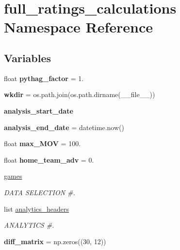 \hypertarget{namespacefull__ratings__calculations}{}\section{full\+\_\+ratings\+\_\+calculations Namespace Reference}
\label{namespacefull__ratings__calculations}
\subsection*{Variables}
\begin{DoxyCompactItemize}
\item 
float {\bfseries pythag\+\_\+factor} = 1.\hypertarget{namespacefull__ratings__calculations_a39ba6d50f8e6e562fb1a2fa2ca375f58}{}\label{namespacefull__ratings__calculations_a39ba6d50f8e6e562fb1a2fa2ca375f58}

\item 
{\bfseries wkdir} = os.\+path.\+join(os.\+path.\+dirname(\+\_\+\+\_\+file\+\_\+\+\_\+))\hypertarget{namespacefull__ratings__calculations_ac96f2c2bb04da9812f110cc76dd60531}{}\label{namespacefull__ratings__calculations_ac96f2c2bb04da9812f110cc76dd60531}

\item 
{\bfseries analysis\+\_\+start\+\_\+date}
\item 
{\bfseries analysis\+\_\+end\+\_\+date} = datetime.\+now()\hypertarget{namespacefull__ratings__calculations_a6a513ee89411a8bf6ef8e7c8340ac6e6}{}\label{namespacefull__ratings__calculations_a6a513ee89411a8bf6ef8e7c8340ac6e6}

\item 
float {\bfseries max\+\_\+\+M\+OV} = 100.\hypertarget{namespacefull__ratings__calculations_ac371015f1925cbaeb2a9b2fd3ceb2601}{}\label{namespacefull__ratings__calculations_ac371015f1925cbaeb2a9b2fd3ceb2601}

\item 
float {\bfseries home\+\_\+team\+\_\+adv} = 0.\hypertarget{namespacefull__ratings__calculations_a640672e2eaa8f30e85a5127ad2db7432}{}\label{namespacefull__ratings__calculations_a640672e2eaa8f30e85a5127ad2db7432}

\item 
\hyperlink{namespacefull__ratings__calculations_ad7fbe206580dbeabe107c6ac5b3fe020}{games}
\begin{DoxyCompactList}\small\item\em D\+A\+TA S\+E\+L\+E\+C\+T\+I\+ON \#. \end{DoxyCompactList}\item 
list \hyperlink{namespacefull__ratings__calculations_aa4a596206d6d9542a6b4bc0a737dfd6a}{analytics\+\_\+headers}
\begin{DoxyCompactList}\small\item\em A\+N\+A\+L\+Y\+T\+I\+CS \#. \end{DoxyCompactList}\item 
{\bfseries diff\+\_\+matrix} = np.\+zeros((30, 12))\hypertarget{namespacefull__ratings__calculations_a305724d5cbc0781e313f580e8480a743}{}\label{namespacefull__ratings__calculations_a305724d5cbc0781e313f580e8480a743}


\end{DoxyCompactItemize}
